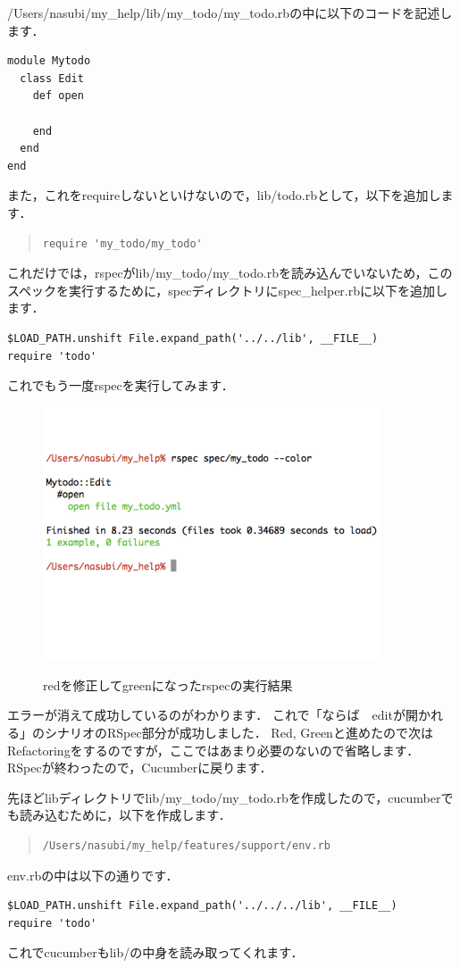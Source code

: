 /Users/nasubi/my\_help/lib/my\_todo/my\_todo.rbの中に以下のコードを記述します．
\begin{lstlisting}[style=customCsh,basicstyle={\scriptsize\ttfamily}]
module Mytodo
  class Edit
    def open

    end
  end
end
\end{lstlisting}
また，これをrequireしないといけないので，lib/todo.rbとして，以下を追加します．
\begin{quote}\begin{verbatim}
require 'my_todo/my_todo'
\end{verbatim}\end{quote}
これだけでは，rspecがlib/my\_todo/my\_todo.rbを読み込んでいないため，このスペックを実行するために，specディレクトリにspec\_helper.rbに以下を追加します．
\begin{lstlisting}[style=customCsh,basicstyle={\scriptsize\ttfamily}]
$LOAD_PATH.unshift File.expand_path('../../lib', __FILE__)
require 'todo'
\end{lstlisting}
これでもう一度rspecを実行してみます．

\begin{figure}[htbp]\begin{center}
\includegraphics[width=10cm,bb= 0 0 737 553]{../figs/./rspec01.001.jpg}
\caption{redを修正してgreenになったrspecの実行結果}
\label{fig:rspec01}
\label{default}\end{center}\end{figure}
エラーが消えて成功しているのがわかります．
これで「ならば　editが開かれる」のシナリオのRSpec部分が成功しました．
Red, Greenと進めたので次はRefactoringをするのですが，ここではあまり必要のないので省略します．
RSpecが終わったので，Cucumberに戻ります．

先ほどlibディレクトリでlib/my\_todo/my\_todo.rbを作成したので，cucumberでも読み込むために，以下を作成します．
\begin{quote}\begin{verbatim}
/Users/nasubi/my_help/features/support/env.rb
\end{verbatim}\end{quote}
env.rbの中は以下の通りです．
\begin{lstlisting}[style=customRuby,basicstyle={\scriptsize\ttfamily}]
$LOAD_PATH.unshift File.expand_path('../../../lib', __FILE__)
require 'todo'
\end{lstlisting}
これでcucumberもlib/の中身を読み取ってくれます．


